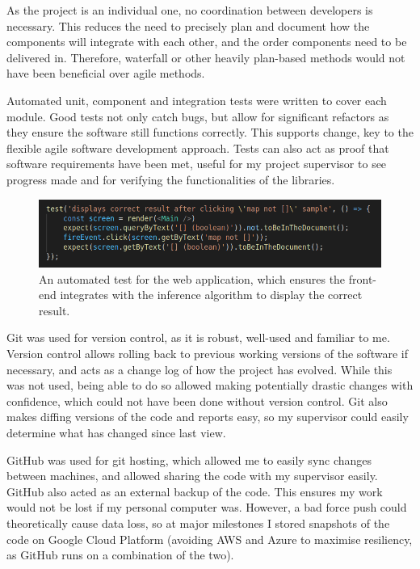 \documentclass[a4paper,fleqn,oneside,12pt]{report}
\begin{document}
As the project is an individual one, no coordination between developers is necessary. This reduces the need to precisely plan and document how the components will integrate with each other, and the order components need to be delivered in. Therefore, waterfall or other heavily plan-based methods would not have been beneficial over agile methods.

Automated unit, component and integration tests were written to cover each module. Good tests not only catch bugs, but allow for significant refactors as they ensure the software still functions correctly. This supports change, key to the flexible agile software development approach. Tests can also act as proof that software requirements have been met, useful for my project supervisor to see progress made and for verifying the functionalities of the libraries.

\begin{figure}[h!]
  \centering
  \includegraphics[width=1.000\linewidth]{images/image18.png}
  \caption{An automated test for the web application, which ensures the front-end integrates with the inference algorithm to display the correct result.}
\end{figure}

Git was used for version control, as it is robust, well-used and familiar to me. Version control allows rolling back to previous working versions of the software if necessary, and acts as a change log of how the project has evolved. While this was not used, being able to do so allowed making potentially drastic changes with confidence, which could not have been done without version control. Git also makes diffing versions of the code and reports easy, so my supervisor could easily determine what has changed since last view.

GitHub was used for git hosting, which allowed me to easily sync changes between machines, and allowed sharing the code with my supervisor easily. GitHub also acted as an external backup of the code. This ensures my work would not be lost if my personal computer was. However, a bad force push could theoretically cause data loss, so at major milestones I stored snapshots of the code on Google Cloud Platform (avoiding AWS and Azure to maximise resiliency, as GitHub runs on a combination of the two).
\end{document}
